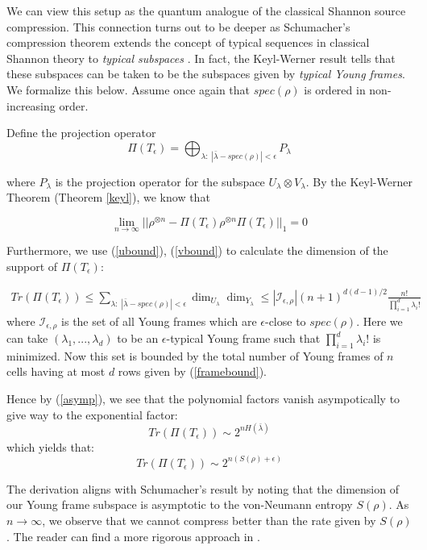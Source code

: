 \documentclass[11pt]{article}%
\begin{document}
We can view this setup as the quantum analogue of the classical Shannon source compression. This connection turns out to be deeper as Schumacher's compression theorem extends the concept of typical sequences in classical Shannon theory to \textit{typical subspaces} \cite{sch}. In fact, the Keyl-Werner result tells that these subspaces can be taken to be the subspaces given by \textit{typical Young frames}. We formalize this below. Assume once again that $spec(\rho)$ is ordered in non-increasing order.

\noindent Define the projection operator $$ \Pi(T_{\epsilon}) = \bigoplus_{\lambda: \; |\bar{\lambda} - spec(\rho)| < \epsilon} P_{\lambda} $$

\noindent where $P_{\lambda}$ is the projection operator for the subspace $U_{\lambda} \otimes V_{\lambda}$. By the Keyl-Werner Theorem (Theorem \ref{keyl}), we know that

$$ \lim_{n \rightarrow \infty} ||\rho^{\otimes n} - \Pi(T_\epsilon) \rho^{\otimes n} \Pi(T_\epsilon) ||_1 = 0$$

\noindent Furthermore, we use (\ref{ubound}), (\ref{vbound}) to calculate the dimension of the support of $\Pi(T_\epsilon)$:

\begin{gather} \label{epsilbound}
  Tr(\Pi(T_\epsilon)) \leq \sum_{\lambda: \; |\bar{\lambda} - spec(\rho)| < \epsilon} \dim_{U_\lambda} \dim_{Y_\lambda} \leq |\mathcal{I}_{\epsilon,\rho}| (n+1)^{d(d-1)/2} \frac{n!}{\prod_{i=1}^d
   \lambda_i!}
\end{gather}
where $\mathcal{I}_{\epsilon,\rho}$ is the set of all Young frames which are $\epsilon$-close to $spec(\rho)$. Here we can take $(\lambda_1,...,\lambda_d)$ to be an $\epsilon$-typical Young frame such that $\prod_{i=1}^d \lambda_i!$ is minimized. Now this set is bounded by the total number of Young frames of $n$ cells having at most $d$ rows given by (\ref{framebound}).

\noindent Hence by (\ref{asymp}), we see that the polynomial factors vanish asympotically to give way to the exponential factor:
$$ Tr(\Pi(T_\epsilon)) \sim 2^{nH({\bar{\lambda}})}  $$
\noindent which yields that:
$$ Tr(\Pi(T_\epsilon)) \sim 2^{n(S(\rho) + \epsilon)}  $$

\noindent The derivation aligns with Schumacher's result by noting that the dimension of our Young frame subspace is asymptotic to the von-Neumann entropy $S(\rho)$. As $n \rightarrow \infty$, we observe that we cannot compress better than the rate given by $S(\rho)$. The reader can find a more rigorous approach in \cite{harrow}.
\end{document}
